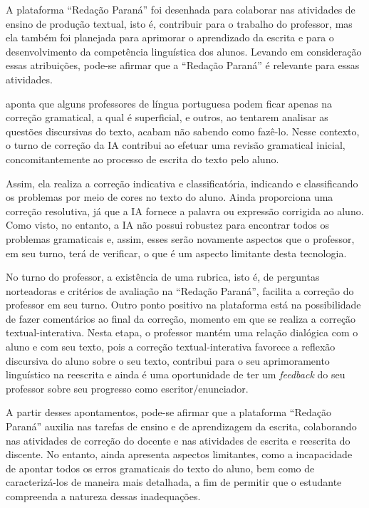 \documentclass[portuguese]{textolivre}
\begin{document}
A plataforma ``Redação Paraná'' foi desenhada para colaborar nas atividades de ensino de produção textual, isto é, contribuir para o trabalho do professor, mas ela também foi planejada para aprimorar o aprendizado da escrita e para o desenvolvimento da competência linguística dos alunos. Levando em consideração essas atribuições, pode-se afirmar que a ``Redação Paraná'' é relevante para essas atividades.

\textcite{conceicao2004} aponta que alguns professores de língua portuguesa podem ficar apenas na correção gramatical, a qual é superficial, e outros, ao tentarem analisar as questões discursivas do texto, acabam não sabendo como fazê-lo. Nesse contexto, o turno de correção da IA contribui ao efetuar uma revisão gramatical inicial, concomitantemente ao processo de escrita do texto pelo aluno.

Assim, ela realiza a correção indicativa e classificatória, indicando e classificando os problemas por meio de cores \cite{ruiz2015} no texto do aluno. Ainda proporciona uma correção resolutiva, já que a IA fornece a palavra ou expressão corrigida ao aluno. Como visto, no entanto, a IA não possui robustez para encontrar todos os problemas gramaticais e, assim, esses serão novamente aspectos que o professor, em seu turno, terá de verificar, o que é um aspecto limitante desta tecnologia.

No turno do professor, a existência de uma rubrica, isto é, de perguntas norteadoras e critérios de avaliação na ``Redação Paraná'', facilita a correção do professor em seu turno. Outro ponto positivo na plataforma está na possibilidade de fazer comentários ao final da correção, momento em que se realiza a correção textual-interativa. Nesta etapa, o professor mantém uma relação dialógica com o aluno e com seu texto, pois a correção textual-interativa favorece a reflexão discursiva do aluno sobre o seu texto, contribui para o seu aprimoramento linguístico na reescrita e ainda é uma oportunidade de ter um \textit{feedback} do seu professor sobre seu progresso como escritor/enunciador.

A partir desses apontamentos, pode-se afirmar que a plataforma ``Redação Paraná'' auxilia nas tarefas de ensino e de aprendizagem da escrita, colaborando nas atividades de correção do docente e nas atividades de escrita e reescrita do discente. No entanto, ainda apresenta aspectos limitantes, como a incapacidade de apontar todos os erros gramaticais do texto do aluno, bem como de caracterizá-los de maneira mais detalhada, a fim de permitir que o estudante compreenda a natureza dessas inadequações.
\end{document}
